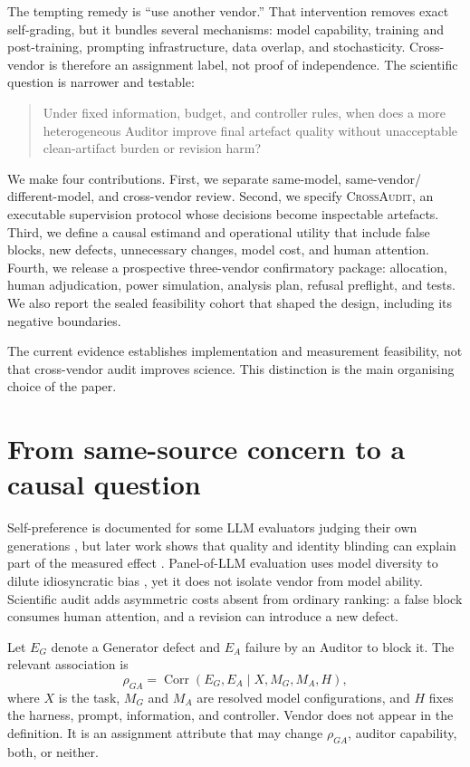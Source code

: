 \documentclass[10pt]{article}
\newcommand{\ca}{\textsc{CrossAudit}}
\begin{document}
The tempting remedy is ``use another vendor.'' That intervention removes exact
self-grading, but it bundles several mechanisms: model capability, training and
post-training, prompting infrastructure, data overlap, and stochasticity.
Cross-vendor is therefore an assignment label, not proof of independence. The
scientific question is narrower and testable:

\begin{quote}\small
Under fixed information, budget, and controller rules, when does a more
heterogeneous Auditor improve final artefact quality without unacceptable
clean-artifact burden or revision harm?
\end{quote}

We make four contributions. First, we separate same-model, same-vendor/
different-model, and cross-vendor review. Second, we specify \ca{}, an
executable supervision protocol whose decisions become inspectable artefacts.
Third, we define a causal estimand and operational utility that include false
blocks, new defects, unnecessary changes, model cost, and human attention.
Fourth, we release a prospective three-vendor confirmatory package: allocation,
human adjudication, power simulation, analysis plan, refusal preflight, and
tests. We also report the sealed feasibility cohort that shaped the design,
including its negative boundaries.

The current evidence establishes implementation and measurement feasibility,
not that cross-vendor audit improves science. This distinction is the main
organising choice of the paper.

\section{From same-source concern to a causal question}

Self-preference is documented for some LLM evaluators judging their own
generations \cite{panickssery2024}, but later work shows that quality and
identity blinding can explain part of the measured effect
\cite{chen2025,roytburg2026}. Panel-of-LLM evaluation uses model diversity to
dilute idiosyncratic bias \cite{verga2024}, yet it does not isolate vendor from
model ability. Scientific audit adds asymmetric costs absent from ordinary
ranking: a false block consumes human attention, and a revision can introduce a
new defect.

Let $E_G$ denote a Generator defect and $E_A$ failure by an Auditor to block it.
The relevant association is
\begin{equation}
\rho_{GA}=\operatorname{Corr}(E_G,E_A\mid X,M_G,M_A,H),
\end{equation}
where $X$ is the task, $M_G$ and $M_A$ are resolved model configurations, and
$H$ fixes the harness, prompt, information, and controller. Vendor does not
appear in the definition. It is an assignment attribute that may change
$\rho_{GA}$, auditor capability, both, or neither.
\end{document}
